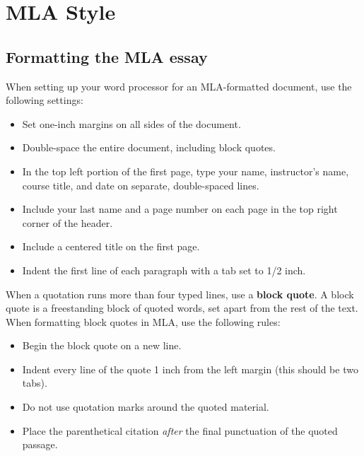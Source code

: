 

\chapter{MLA Style} 


\section{Formatting the MLA essay}
When setting up your word processor for an MLA-formatted document, use the 
following settings:

\begin{itemize}
\item Set one-inch margins on all sides of the document.
\item Double-space the entire document, including block quotes.
\item In the top left portion of the first page, type your name, instructor's name, course title, and date on separate, double-spaced lines.
\item Include your last name and a page number on each page in the top right corner of the header.
\item Include a centered title on the first page.
\item Indent the first line of each paragraph with a tab set to 1/2 inch.
\end{itemize}

\newpage



When a quotation runs more than four typed lines, use a \textbf{block quote}. A block quote is a freestanding block of quoted words, set apart from the rest of the text. When formatting block quotes in MLA, use the following rules: 

\begin{itemize}
\item Begin the block quote on a new line. 
\item Indent every line of the quote 1 inch from the left margin (this should be two tabs). 
\item Do not use quotation marks around the quoted material. 
\item Place the parenthetical citation \emph{after} the final punctuation of the quoted passage.
\end{itemize}

